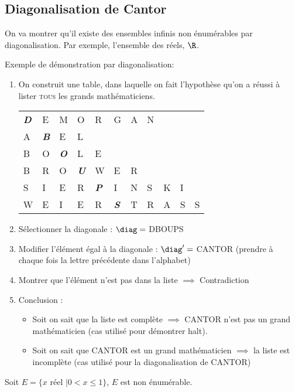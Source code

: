 \begin{myexem}
\section{Diagonalisation de Cantor}
\label{sec:cantor}
On va montrer qu'il existe des ensembles infinis non énumérables par diagonalisation. Par exemple, l'ensemble des réels, $\R$.
\begin{myexem}
	Exemple de démonstration par diagonalisation:
	\begin{enumerate}
		\item On construit une table, dans laquelle on fait l'hypothèse qu'on a réussi à lister \textsc{tous} les grands mathématiciens.\\
			\begin{tabular}{lllllllllll}
				\emph{\textbf{D}}&E& M&O&R&G&A&N&&& \\
				A&\emph{\textbf{B}}&E&L&&&&&&&\\
				B&O&\emph{\textbf{O}}&L&E&&&&&&\\
				B&R&O&\emph{\textbf{U}}&W&E&R&&&&\\
				S&I&E&R&\emph{\textbf{P}}&I&N&S&K&I&\\
				W&E&I&E&R&\emph{\textbf{S}}&T&R&A&S&S\\
			\end{tabular}
		\item Sélectionner la diagonale : $\diag = $ DBOUPS
		\item Modifier l'élément égal à la diagonale : $\diag' =$ CANTOR (prendre à chaque fois la lettre précédente dans l'alphabet)
		\item Montrer que l'élément n'est pas dans la liste $\implies$ Contradiction
		\item Conclusion :
			\begin{itemize}
				\item Soit on sait que la liste est complète
					\subitem $ \implies$ CANTOR n'est pas un grand
					mathématicien (cas utilisé pour démontrer halt).
				\item Soit on sait que CANTOR est un grand
					mathématicien
					\subitem $ \implies$ la liste est incomplète (cas utilisé pour la diagonalisation de CANTOR)
			\end{itemize}
	\end{enumerate}
\end{myexem}

\begin{mytheo}
	Soit $E = \{ x \text{ réel }| 0<x\leq1\}$, $E$ est non énumérable.


\end{mytheo}
\end{myexem}
